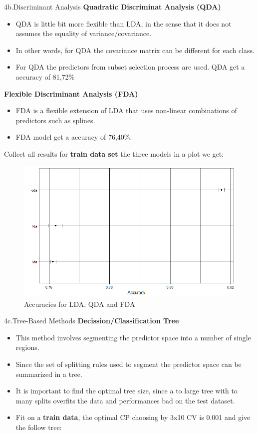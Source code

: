 \documentclass[xcolor=dvipsnames]{beamer}
\begin{document}
\begin{frame}{4b.Discriminant Analysis}
\textbf{Quadratic Discriminat Analysis (QDA)}
\begin{itemize}
\item QDA is little bit more flexible than LDA, in the sense that it does not assumes the equality of variance/covariance.
\item In other words, for QDA the covariance matrix can be different for each class.
\item For QDA the predictors from subset selection process are used. QDA get a accuracy of 81,72\%
\end{itemize}
\textbf{Flexible Discriminant Analysis (FDA)}
\begin{itemize}
\item FDA is a flexible extension of LDA that uses non-linear combinations of predictors such as splines.
\item FDA model get a accuracy of 76,40\%.
\end{itemize}
\end{frame}

\begin{frame}
Collect all results for \textbf{train data set} the three models in a plot we get:
\begin{figure}
    \centering
    \includegraphics[scale= 0.45]{QDA_FDA_LDA.png}
    \caption{Accuracies for LDA, QDA and FDA}
    \label{fig:my_label}
\end{figure}
\end{frame}

\begin{frame}{4c.Tree-Based Methods}
\textbf{Decission/Classification Tree}
\begin{itemize}
\item This method involves segmenting the predictor space into a number of single regions.
\item Since the set of splitting rules used to segment the predictor space can be summarized in a tree.
\item It is important to find the optimal tree size, since a to large tree with to many splits overfits the data and performances bad on the test dataset.
\item Fit on a \textbf{train data}, the optimal CP choosing by 3x10 CV is 0.001 and give the follow tree:
\end{itemize}
\end{frame}
\end{document}
